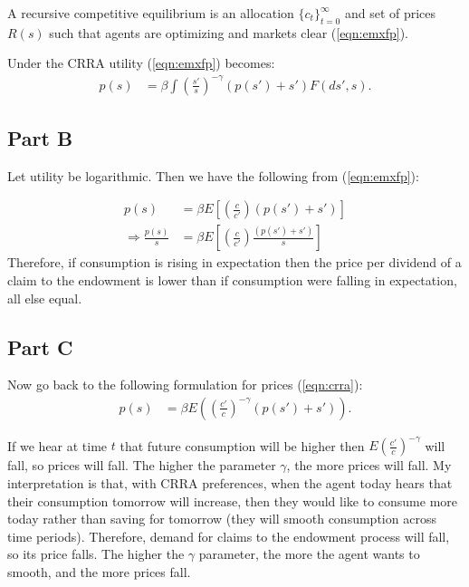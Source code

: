 \documentclass[11pt]{article} %
\begin{document}
A recursive competitive equilibrium is an allocation $\{c_t\}_{t=0}^{\infty}$ and set of prices $R(s)$ such that agents are optimizing and markets clear (\ref{eqn:emxfp}).

Under the CRRA utility (\ref{eqn:emxfp}) becomes:
\begin{align}
p(s) &= \beta\int \left(\frac{s'}{s} \right)^{-\gamma} (p(s') + s' )F(ds',s). \label{eqn:crra}
\end{align}

\subsection{Part B}
Let utility be logarithmic. Then we have the following from (\ref{eqn:emxfp}):

\begin{align*}
p(s) &= \beta E \left[ \left(\frac{c}{c'} \right)(p(s') + s' )\right]\\
\Rightarrow \frac{p(s)}{s} &=  \beta E \left[ \left(\frac{c}{c'} \right)\frac{(p(s') + s' )}{s}\right]
\end{align*}
Therefore, if consumption is rising in expectation then the price per dividend of a claim to the endowment is lower than if consumption were falling in expectation, all else equal.
\subsection{Part C}
Now go back to the following formulation for prices (\ref{eqn:crra}):
\begin{align*}
p(s) &= \beta E\left(\left(\frac{c'}{c} \right)^{-\gamma} (p(s') + s' )\right). 
\end{align*}

If we hear at time $t$ that future consumption will be higher then $E\left(\frac{c'}{c} \right)^{-\gamma}$ will fall, so prices will fall. The higher the parameter $\gamma$, the more prices will fall. My interpretation is that, with CRRA preferences, when the agent today hears that their consumption tomorrow will increase, then they would like to consume more today rather than saving for tomorrow (they will smooth consumption across time periods). Therefore, demand for claims to the endowment process will fall, so its price falls. The higher the $\gamma$ parameter, the more the agent wants to smooth, and the more prices fall.
\end{document}
